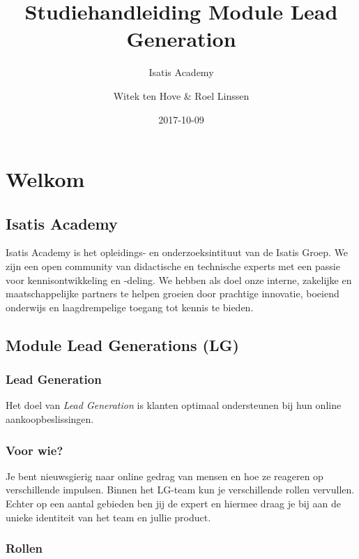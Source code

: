 \documentclass[]{book}
\title{Studiehandleiding Module Lead Generation}
\subtitle{Isatis Academy}
\author{Witek ten Hove \& Roel Linssen}
\date{2017-10-09}
\begin{document}
\maketitle

{
\setcounter{tocdepth}{1}
\tableofcontents
}
\chapter{Welkom}\label{welkom}

\section{Isatis Academy}\label{isatis-academy}

Isatis Academy is het opleidings- en onderzoeksintituut van de Isatis
Groep. We zijn een open community van didactische en technische experts
met een passie voor kennisontwikkeling en -deling. We hebben als doel
onze interne, zakelijke en maatschappelijke partners te helpen groeien
door prachtige innovatie, boeiend onderwijs en laagdrempelige toegang
tot kennis te bieden.

\section{Module Lead Generations (LG)}\label{module-lead-generations-lg}

\subsection{Lead Generation}\label{lead-generation}

Het doel van \emph{Lead Generation} is klanten optimaal ondersteunen bij
hun online aankoopbeslissingen.

\subsection{Voor wie?}\label{voor-wie}

Je bent nieuwsgierig naar online gedrag van mensen en hoe ze reageren op
verschillende impulsen. Binnen het LG-team kun je verschillende rollen
vervullen. Echter op een aantal gebieden ben jij de expert en hiermee
draag je bij aan de unieke identiteit van het team en jullie product.

\subsection{Rollen}\label{rollen}
\end{document}
